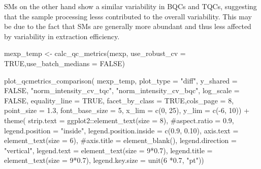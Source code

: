 \documentclass[
  letterpaper,
  DIV=11,
  numbers=noendperiod]{scrartcl}
\newenvironment{Shaded}{\begin{snugshade}}{\end{snugshade}}
\newcommand{\AttributeTok}[1]{\textcolor[rgb]{0.40,0.45,0.13}{#1}}
\newcommand{\CommentTok}[1]{\textcolor[rgb]{0.37,0.37,0.37}{#1}}
\newcommand{\ConstantTok}[1]{\textcolor[rgb]{0.56,0.35,0.01}{#1}}
\newcommand{\DecValTok}[1]{\textcolor[rgb]{0.68,0.00,0.00}{#1}}
\newcommand{\FloatTok}[1]{\textcolor[rgb]{0.68,0.00,0.00}{#1}}
\newcommand{\FunctionTok}[1]{\textcolor[rgb]{0.28,0.35,0.67}{#1}}
\newcommand{\NormalTok}[1]{\textcolor[rgb]{0.00,0.23,0.31}{#1}}
\newcommand{\OtherTok}[1]{\textcolor[rgb]{0.00,0.23,0.31}{#1}}
\newcommand{\SpecialCharTok}[1]{\textcolor[rgb]{0.37,0.37,0.37}{#1}}
\newcommand{\StringTok}[1]{\textcolor[rgb]{0.13,0.47,0.30}{#1}}
\begin{document}
SMs on the other hand show a similar variability in BQCs and TQCs,
suggesting that the sample processing lesss contributed to the overall
variability. This may be due to the fact that SMs are generally more
abundant and thus less affected by variability in extraction efficiency.

\begin{Shaded}
\begin{Highlighting}[]
\NormalTok{mexp\_temp }\OtherTok{\textless{}{-}}  \FunctionTok{calc\_qc\_metrics}\NormalTok{(mexp, }\AttributeTok{use\_robust\_cv =} \ConstantTok{TRUE}\NormalTok{,}\AttributeTok{use\_batch\_medians =} \ConstantTok{FALSE}\NormalTok{)}

\FunctionTok{plot\_qcmetrics\_comparison}\NormalTok{(}
\NormalTok{  mexp\_temp,}
  \AttributeTok{plot\_type =} \StringTok{"diff"}\NormalTok{,}
  \AttributeTok{y\_shared =} \ConstantTok{FALSE}\NormalTok{,}
  \StringTok{"norm\_intensity\_cv\_tqc"}\NormalTok{,}
  \StringTok{"norm\_intensity\_cv\_bqc"}\NormalTok{,}
  \AttributeTok{log\_scale =} \ConstantTok{FALSE}\NormalTok{,}
  \AttributeTok{equality\_line =} \ConstantTok{TRUE}\NormalTok{,}
  \AttributeTok{facet\_by\_class =} \ConstantTok{TRUE}\NormalTok{,}\AttributeTok{cols\_page =} \DecValTok{8}\NormalTok{,}
    \AttributeTok{point\_size =} \FloatTok{1.3}\NormalTok{,}
  \AttributeTok{font\_base\_size =} \DecValTok{5}\NormalTok{,}
  \AttributeTok{x\_lim =} \FunctionTok{c}\NormalTok{(}\DecValTok{0}\NormalTok{, }\DecValTok{25}\NormalTok{),}
  \AttributeTok{y\_lim =} \FunctionTok{c}\NormalTok{(}\SpecialCharTok{{-}}\DecValTok{6}\NormalTok{, }\DecValTok{10}\NormalTok{)) }\SpecialCharTok{+} 
    \FunctionTok{theme}\NormalTok{(}
      \AttributeTok{strip.text =}\NormalTok{ ggplot2}\SpecialCharTok{::}\FunctionTok{element\_text}\NormalTok{(}\AttributeTok{size =} \DecValTok{8}\NormalTok{),}
      \CommentTok{\#aspect.ratio = 0.9,}
      \AttributeTok{legend.position =} \StringTok{"inside"}\NormalTok{,}
      \AttributeTok{legend.position.inside =} \FunctionTok{c}\NormalTok{(}\FloatTok{0.9}\NormalTok{, }\FloatTok{0.10}\NormalTok{),}
      \AttributeTok{axis.text =} \FunctionTok{element\_text}\NormalTok{(}\AttributeTok{size =} \DecValTok{6}\NormalTok{),}
      \CommentTok{\#axis.title = element\_blank(),}
      \AttributeTok{legend.direction =} \StringTok{"vertical"}\NormalTok{, }
      \AttributeTok{legend.text =} \FunctionTok{element\_text}\NormalTok{(}\AttributeTok{size =} \DecValTok{9}\SpecialCharTok{*}\FloatTok{0.7}\NormalTok{), }
      \AttributeTok{legend.title =} \FunctionTok{element\_text}\NormalTok{(}\AttributeTok{size =} \DecValTok{9}\SpecialCharTok{*}\FloatTok{0.7}\NormalTok{),}
      \AttributeTok{legend.key.size =} \FunctionTok{unit}\NormalTok{(}\DecValTok{6} \SpecialCharTok{*}\FloatTok{0.7}\NormalTok{, }\StringTok{"pt"}\NormalTok{))}
\end{Highlighting}
\end{Shaded}
\end{document}
